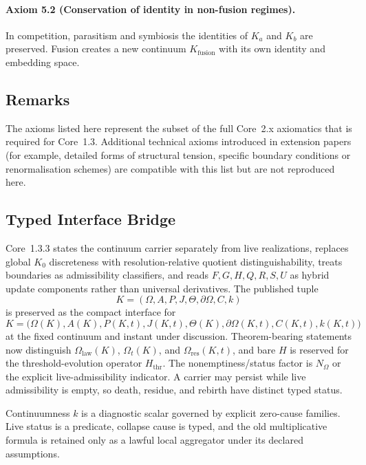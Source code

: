 \paragraph{Axiom 5.2 (Conservation of identity in non-fusion regimes).}
In competition, parasitism and symbiosis the identities of \(K_a\) and \(K_b\)
are preserved.  Fusion creates a new continuum \(K_{\mathrm{fusion}}\) with its
own identity and embedding space.

\subsection{Remarks}

The axioms listed here represent the subset of the full Core~2.x axiomatics
that is required for Core~1.3. Additional technical axioms introduced in
extension papers (for example, detailed forms of structural tension, specific
boundary conditions or renormalisation schemes) are compatible with this list
but are not reproduced here.


\subsection{Typed Interface Bridge}
\label{sec:oc133-axioms-scientific-closure-bridge}

Core~1.3.3 states the continuum carrier separately from live realizations,
replaces global \(K_0\) discreteness with resolution-relative quotient
distinguishability, treats boundaries as admissibility classifiers, and reads
\(F,G,H,Q,R,S,U\) as hybrid update components rather than universal
derivatives.  The published tuple
\[
K=(\Omega,A,P,J,\Theta,\partial\Omega,C,k)
\]
is preserved as the compact interface for
\[
K=\big(\Omega(K),A(K),P(K,t),J(K,t),\Theta(K),
       \partial\Omega(K,t),C(K,t),k(K,t)\big)
\]
at the fixed continuum and instant under discussion.  Theorem-bearing
statements now distinguish \(\Omega_{\mathrm{law}}(K)\), \(\Omega_t(K)\), and
\(\Omega_{\mathrm{res}}(K,t)\), and bare \(H\) is reserved for the
threshold-evolution operator \(H_{\mathrm{thr}}\).  The nonemptiness/status
factor is \(N_{\Omega}\) or the explicit live-admissibility indicator. A carrier may
persist while live admissibility is empty, so death, residue, and rebirth have
distinct typed status.

Continuumness \(k\) is a diagnostic scalar governed by explicit zero-cause
families.  Live status is a predicate, collapse cause is typed, and the old
multiplicative formula is retained only as a lawful local aggregator under its
declared assumptions.
